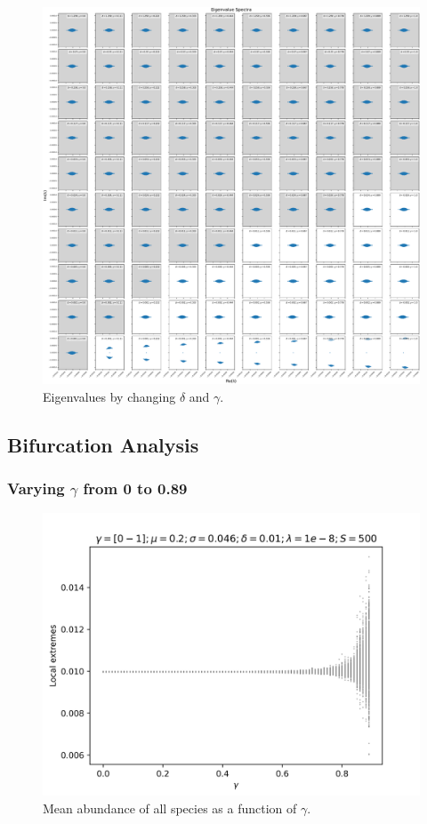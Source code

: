 \documentclass{article}
\begin{document}
\clearpage

\begin{figure}[H]
    \centering
    \includegraphics[width=\linewidth]{DeltaGamma/EigenvalueSpectraLog.pdf}
    \caption{Eigenvalues by changing $\delta$ and $\gamma$.}
\end{figure}

\clearpage


\subsection{Bifurcation Analysis}

\subsubsection{Varying $\gamma$ from 0 to 0.89}

\begin{figure}[H]
    \centering
    \includegraphics[width=\linewidth]{Bifurcation/BifurcationMeanGamma.png}
    \caption{Mean abundance of all species as a function of $\gamma$.}
\end{figure}
\end{document}
